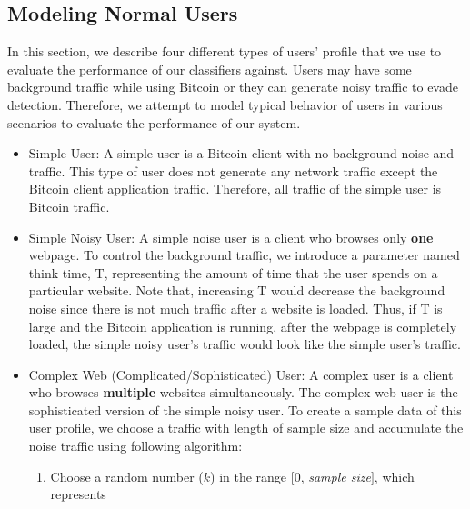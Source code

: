 \subsection{Modeling Normal Users}\label{simpleuser}

In this section, we describe four different types of users' profile that we use to evaluate the performance of our \bc classifiers against. Users may have some background traffic while using Bitcoin or they can generate noisy traffic to evade detection. Therefore, we attempt to model typical behavior of users in various scenarios to evaluate the performance of our system.

\begin{itemize}
    \item Simple User: A simple user is a Bitcoin client with no background noise and traffic. This type of user does not generate any network traffic except the Bitcoin client application traffic. Therefore, all traffic of the simple user is Bitcoin traffic. 
    \item Simple Noisy User: A simple noise user is a \bc client who browses only \textbf{one} webpage.%
    To control the background traffic, we introduce a parameter named think time, T, representing the amount of time that the user spends on a particular website. Note that, increasing T would decrease the background noise since there is not much traffic after a website is loaded. Thus, if T is large and the Bitcoin application is running, after the webpage is completely loaded, the simple noisy user's traffic would look like the simple user's traffic.
    \item Complex Web (Complicated/Sophisticated) User: A complex user is a \bc client who browses \textbf{multiple} websites simultaneously. %
    The complex web user is the sophisticated version of the simple noisy user. To create a sample data of this user profile, we choose a \bc traffic with length of sample size and accumulate the noise traffic using following algorithm: 
\begin{enumerate}
 \item Choose a random number ($k$) in the range $[0$, \textit{sample size}$]$, which represents

\end{enumerate}
\end{itemize}
